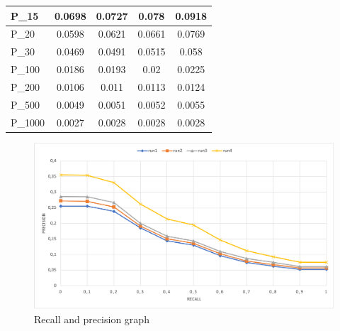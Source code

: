 \begin{center}
\begin{tabular}{ |l|c|c|c|c| }
        P\_15 & 0.0698 & 0.0727 & 0.078 & 0.0918 \\ \hline
        P\_20 & 0.0598 & 0.0621 & 0.0661 & 0.0769 \\ \hline
        P\_30 & 0.0469 & 0.0491 & 0.0515 & 0.058 \\ \hline
        P\_100 & 0.0186 & 0.0193 & 0.02 & 0.0225 \\ \hline
        P\_200 & 0.0106 & 0.011 & 0.0113 & 0.0124 \\ \hline
        P\_500 & 0.0049 & 0.0051 & 0.0052 & 0.0055 \\ \hline
        P\_1000 & 0.0027 & 0.0028 & 0.0028 & 0.0028 \\ \hline

    \end{tabular}
\end{center}



\begin{figure}[h!]
    \includegraphics[width=\textwidth]{figure/rp_eng.png}
    \caption{Recall and precision graph}
    \label{fig:rp_french}
  \end{figure}